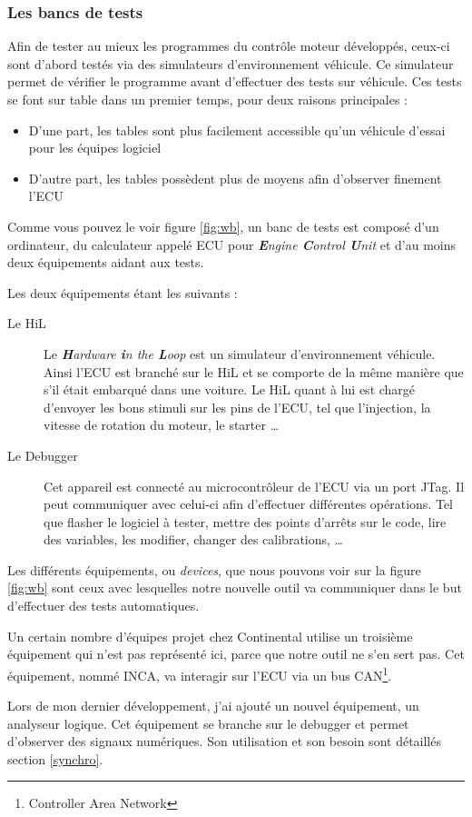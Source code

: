 \subsubsection{Les bancs de tests}\label{wb}
Afin de tester au mieux les programmes du contrôle moteur développés, ceux-ci sont d'abord testés via des simulateurs d'environnement véhicule. Ce simulateur permet de vérifier le programme avant d'effectuer des tests sur véhicule. Ces tests se font sur table dans un premier temps, pour deux raisons principales : 
\begin{itemize}
	\item D'une part, les tables sont plus facilement accessible qu'un véhicule d'essai pour les équipes logiciel
	\item D'autre part, les tables possèdent plus de moyens afin d'observer finement l'ECU
\end{itemize}		
Comme vous pouvez le voir figure \ref{fig:wb}, un banc de tests est composé d'un ordinateur, du calculateur appelé ECU pour \textit{\textbf{E}ngine \textbf{C}ontrol \textbf{U}nit} et d'au moins deux équipements aidant aux tests. 

Les deux équipements étant les suivants : 
\begin{description}
	\item[Le HiL] Le \textit{\textbf{H}ardware \textbf{i}n the \textbf{L}oop} est un simulateur d'environnement véhicule. Ainsi l'ECU est branché sur le HiL et se comporte de la même manière que s'il était embarqué dans une voiture. Le HiL quant à lui est chargé d'envoyer les bons stimuli sur les pins de l'ECU, tel que l'injection, la vitesse de rotation du moteur, le starter \ldots
	\item[Le Debugger] Cet {appareil} est connecté au microcontrôleur de l'ECU via un port JTag. Il peut communiquer avec celui-ci afin d'effectuer différentes opérations. Tel que flasher le logiciel à tester, mettre des points d'arrêts sur le code, lire des variables, les modifier, changer des calibrations, \ldots
\end{description}
Les différents équipements, ou \textit{devices}, que nous pouvons voir sur la figure \ref{fig:wb} sont ceux avec lesquelles notre nouvelle outil va communiquer dans le but d'effectuer des tests automatiques. 		

\begin{remarque}
	Un certain nombre d'équipes projet chez Continental utilise un troisième équipement qui n'est pas représenté ici, parce que notre outil ne s'en sert pas. Cet équipement, nommé INCA, va interagir sur l'ECU via un bus CAN\footnote{Controller Area Network}.
	
	Lors de mon dernier développement, j'ai ajouté un nouvel équipement, un analyseur logique. Cet équipement se branche sur le debugger et permet d'observer des signaux numériques. Son utilisation et son besoin sont détaillés section \ref{synchro}.
\end{remarque}

